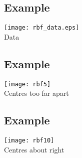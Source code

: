 
\begin{slide}
\section[-1.5]{Example}

\begin{PauseHighLight}

\begin{center}
  \texttt{[image: rbf\_data.eps]}\\
  Data
\end{center}

\end{PauseHighLight}
\end{slide}


\begin{slide}
\section[-1.5]{Example}

\begin{PauseHighLight}

\begin{center}
  \texttt{[image: rbf5]}\\
  Centres too far apart
\end{center}

\end{PauseHighLight}
\end{slide}


\begin{slide}
\section[-1.5]{Example}

\begin{PauseHighLight}

\begin{center}
  \texttt{[image: rbf10]}\\
  Centres about right
\end{center}

\end{PauseHighLight}
\end{slide}

